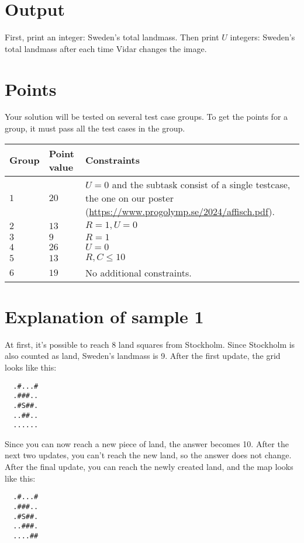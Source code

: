 \section*{Output}
First, print an integer: Sweden's total landmass.
Then print $U$ integers: Sweden's total landmass after each time Vidar changes the image.

\section*{Points}
Your solution will be tested on several test case groups.
To get the points for a group, it must pass all the test cases in the group.

\noindent
\begin{tabular}{| l | l | p{12cm} |}
  \hline
  \textbf{Group} & \textbf{Point value} & \textbf{Constraints} \\ \hline
  $1$    & $20$       & $U=0$ and the subtask consist of a single testcase, the one on our poster (\url{https://www.progolymp.se/2024/affisch.pdf}). \\ \hline
  $2$    & $13$       & $R=1, U=0$ \\ \hline
  $3$    & $9$        & $R=1$ \\ \hline
  $4$    & $26$       & $U=0$ \\ \hline
  $5$    & $13$       & $R,C \le 10$ \\ \hline
  $6$    & $19$       & No additional constraints. \\ \hline
\end{tabular}

\section*{Explanation of sample 1}
At first, it's possible to reach 8 land squares from Stockholm. Since Stockholm is also counted as land, Sweden's landmass is 9. After the first update, the grid looks like this:

\noindent
\begin{verbatim}
  .#...#
  .###..
  .#S##.
  ..##..
  ......
\end{verbatim}

\noindent
Since you can now reach a new piece of land, the answer becomes 10. After the next two updates, you can't reach the new land, so the answer does not change.
After the final update, you can reach the newly created land, and the map looks like this:

\noindent
\begin{verbatim}
  .#...#
  .###..
  .#S##.
  ..###.
  ....##
\end{verbatim}
